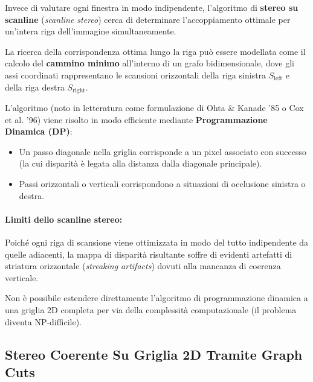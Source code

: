 ﻿\documentclass[11pt, a4paper]{article}
\begin{document}
Invece di valutare ogni finestra in modo indipendente, l'algoritmo di \textbf{stereo su scanline} (\emph{scanline stereo}) cerca di determinare l'accoppiamento ottimale per un'intera riga dell'immagine simultaneamente.


La ricerca della corrispondenza ottima lungo la riga può essere modellata come il calcolo del \textbf{cammino minimo} all'interno di un grafo bidimensionale, dove gli assi coordinati rappresentano le scansioni orizzontali della riga sinistra $S_{\text{left}}$ e della riga destra $S_{\text{right}}$.


L'algoritmo (noto in letteratura come formulazione di Ohta \& Kanade '85 o Cox et al. '96) viene risolto in modo efficiente mediante \textbf{Programmazione Dinamica (DP)}:
\begin{itemize}
    \item Un passo diagonale nella griglia corrisponde a un pixel associato con successo (la cui disparità è legata alla distanza dalla diagonale principale).
    \item Passi orizzontali o verticali corrispondono a situazioni di occlusione sinistra o destra.
\end{itemize}

\paragraph{Limiti dello scanline stereo:} Poiché ogni riga di scansione viene ottimizzata in modo del tutto indipendente da quelle adiacenti, la mappa di disparità risultante soffre di evidenti artefatti di striatura orizzontale (\emph{streaking artifacts}) dovuti alla mancanza di coerenza verticale.


Non è possibile estendere direttamente l'algoritmo di programmazione dinamica a una griglia 2D completa per via della complessità computazionale (il problema diventa NP-difficile).

\subsection{Stereo Coerente Su Griglia 2D Tramite Graph Cuts}
\end{document}
